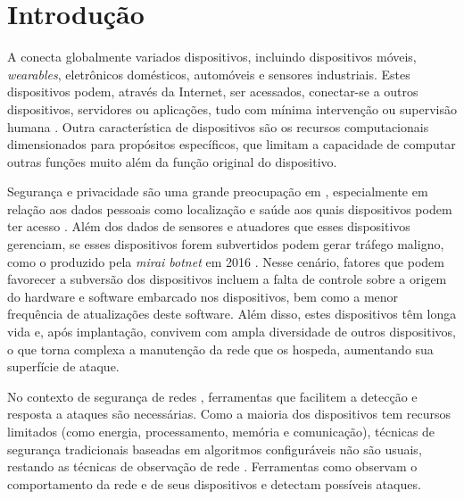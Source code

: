
\chapter{Introdução}\label{cha:intro}

A \iot conecta globalmente variados dispositivos, incluindo dispositivos móveis,
\emph{wearables}, eletrônicos domésticos, automóveis e sensores industriais.
Estes dispositivos podem, através da Internet, ser acessados, conectar-se a
outros dispositivos, servidores ou aplicações, tudo com mínima intervenção ou
supervisão humana
\cite{Tahsien2020,abane2019,haddadpajouh2019survey,Shanbhag2015}.
Outra característica de dispositivos \iot são os recursos computacionais
dimensionados para propósitos específicos, que limitam a capacidade de computar
outras funções muito além da função original do dispositivo.


Segurança e privacidade são uma grande preocupação em \iot, especialmente em
relação aos dados pessoais como localização e saúde aos quais dispositivos podem ter
acesso \cite{sengupta2020comprehensive}.
Além dos dados de sensores e atuadores que esses dispositivos gerenciam, se
esses dispositivos forem subvertidos podem gerar tráfego maligno, como o
produzido pela \emph{mirai botnet} em 2016
\cite{Kambourakis2017,Kolias2017mirai}.
Nesse cenário, fatores que podem favorecer a subversão dos dispositivos incluem
a falta de controle sobre a origem do hardware e software embarcado nos
dispositivos, bem como a menor frequência de atualizações deste software.
Além disso, estes dispositivos têm longa vida e, após implantação, convivem com
ampla diversidade de outros dispositivos, o que torna complexa a manutenção da rede
que os hospeda, aumentando sua superfície de ataque.

No contexto de segurança de redes \iot, ferramentas que facilitem a detecção e
resposta a ataques são necessárias.
Como a maioria dos dispositivos \iot tem recursos limitados (como energia,
processamento, memória e comunicação), técnicas de segurança tradicionais
baseadas em algoritmos configuráveis não são usuais, restando as
técnicas de observação de rede \cite{Zhou2017}.
Ferramentas como \nids observam o comportamento da rede e de seus dispositivos
e detectam possíveis ataques.
% 

